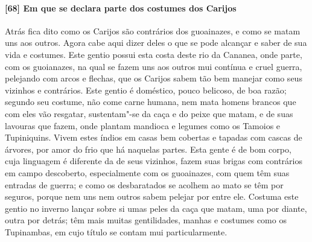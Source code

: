\begin{linenumbers}
\paragraph{[68] Em que se declara parte dos costumes dos Carijos} \quad
Atrás fica dito como os Carijos são contrários dos guoainazes, e como se matam uns aos
outros. Agora cabe aqui dizer deles o que se pode alcançar e saber de sua vida e costumes.
Este gentio possui esta costa deste rio da Cananea, onde parte, com os guoianazes, na qual
se fazem uns aos outros mui contínua e cruel guerra, pelejando com arcos e flechas, que os
Carijos sabem tão bem manejar como seus vizinhos e contrários. Este gentio é doméstico,
pouco belicoso, de boa razão; segundo seu costume, não come carne humana, nem mata homens
brancos que com eles vão resgatar, sustentam"-se da caça e do peixe que matam, e de suas
lavouras que fazem, onde plantam mandioca e legumes como os Tamoios e Tupiniquins. Vivem
estes índios em casas bem cobertas e tapadas com cascas de árvores, por amor do frio que
há naquelas partes. Esta gente é de bom corpo, cuja linguagem é diferente da de seus
vizinhos, fazem suas brigas com contrários em campo descoberto, especialmente com os
guoainazes, com quem têm suas entradas de guerra; e como os desbaratados se acolhem ao
mato se têm por seguros, porque nem uns nem outros sabem pelejar por entre ele. Costuma
este gentio no inverno lançar sobre si umas peles da caça que matam, uma por diante, outra
por detrás; têm mais muitas gentilidades, manhas e costumes como os Tupinambas, em cujo
título se contam mui particularmente.


\end{linenumbers}
